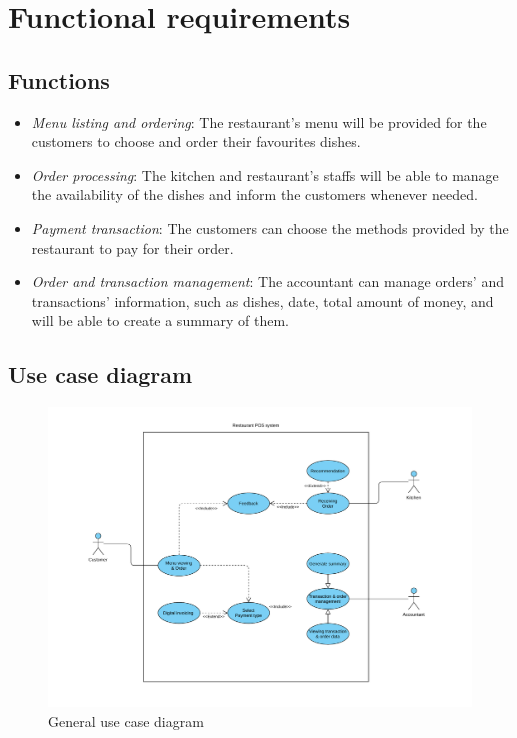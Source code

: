 \documentclass[a4paper,11pt]{extarticle}
\begin{document}
\section{Functional requirements}

\subsection{Functions}
\begin{itemize}
    \item[] \emph{Menu listing and ordering}: The restaurant's menu will be provided for the customers to choose and order their favourites dishes.
    \item[] \emph{Order processing}: The kitchen and restaurant's staffs will be able to manage the availability of the dishes and inform the customers whenever needed.
    \item[] \emph{Payment transaction}: The customers can choose the methods provided by the restaurant to pay for their order. 
    \item[] \emph{Order and transaction management}: The accountant can manage orders' and transactions' information, such as dishes, date, total amount of money, and will be able to create a summary of them.
\end{itemize}

\subsection{Use case diagram}
\begin{figure}[htbp]
    \centering
    \includegraphics[width=1\textwidth]{general_usecase_diagram.pdf}
    \caption{General use case diagram}
    \label{fig:usecasediagram}
\end{figure}
\end{document}
